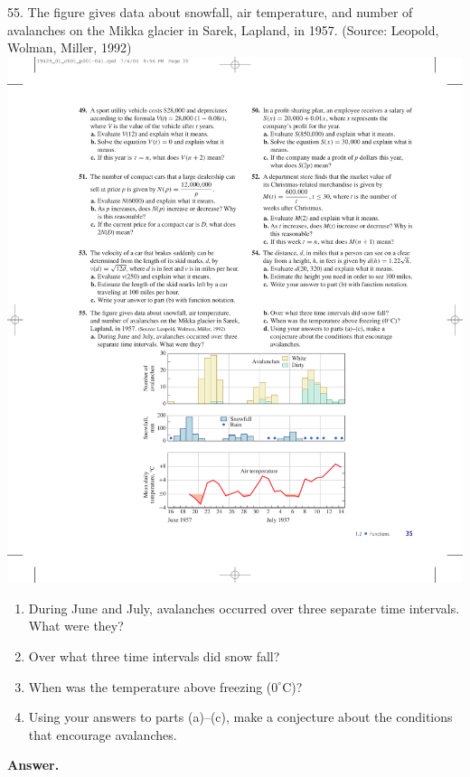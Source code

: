 \documentclass[10pt,]{book}
\theoremstyle{plain}
\theoremstyle{definition}
\theoremstyle{definition}
\theoremstyle{definition}
\newcommand\degree[0]{^{\circ}}
\begin{document}
\begin{exerciselist}
\item[55.]\hypertarget{exercise-65}{}The figure gives data about snowfall, air temperature, and number of avalanches on the Mikka glacier in Sarek, Lapland, in 1957. (Source: Leopold, Wolman, Miller, 1992) \includegraphics[width=1\linewidth]{images/fig-ex-1-2-55}
 \leavevmode%
\begin{enumerate}[label=\alph*]
\item\hypertarget{li-222}{}During June and July, avalanches occurred over three separate time intervals. What were they?%
\item\hypertarget{li-223}{}Over what three time intervals did snow fall?%
\item\hypertarget{li-224}{}When was the temperature above freezing (\(0\degree\)C)?%
\item\hypertarget{li-225}{}Using your answers to parts (a)–(c), make a conjecture about the conditions that encourage avalanches.%
\end{enumerate}
%
\par\smallskip
\par\smallskip
\noindent\textbf{Answer.}\hypertarget{answer-38}{}\quad
\leavevmode%
\begin{enumerate}[label=\alph*]

\end{enumerate}
\end{exerciselist}
\end{document}
